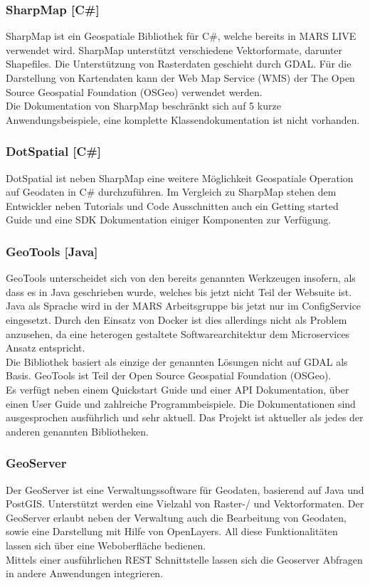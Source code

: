 \documentclass[10pt,conference,compsocconf]{IEEEtran}
\begin{document}
\subsubsection{SharpMap [C\#]}
SharpMap ist ein Geospatiale Bibliothek für C\#, welche bereits in MARS LIVE verwendet wird. SharpMap unterstützt verschiedene Vektorformate, darunter Shapefiles. Die Unterstützung von Rasterdaten geschieht durch GDAL. Für die Darstellung von Kartendaten kann der Web Map Service (WMS) der The Open Source Geospatial Foundation (OSGeo) verwendet werden.\\
Die Dokumentation von SharpMap beschränkt sich auf 5 kurze Anwendungsbeispiele, eine komplette Klassendokumentation ist nicht vorhanden.\\
	
\subsubsection{DotSpatial [C\#]}
DotSpatial ist neben SharpMap eine weitere Möglichkeit Geospatiale Operation auf Geodaten in C\# durchzuführen. Im Vergleich zu SharpMap stehen dem Entwickler neben Tutorials und Code Ausschnitten auch ein Getting started Guide und eine SDK Dokumentation einiger Komponenten zur Verfügung.\\
	
\subsubsection{GeoTools [Java]}
GeoTools unterscheidet sich von den bereits genannten Werkzeugen insofern, als dass es in Java geschrieben wurde, welches bis jetzt nicht Teil der Websuite ist. Java als Sprache wird in der MARS Arbeitsgruppe bis jetzt nur im ConfigService eingesetzt. Durch den Einsatz von Docker ist dies allerdings nicht als Problem anzusehen, da eine heterogen gestaltete Softwarearchitektur dem Microservices Ansatz entspricht.\\
Die Bibliothek basiert als einzige der genannten Lösungen nicht auf GDAL als Basis. GeoTools ist Teil der Open Source Geospatial Foundation (OSGeo).\\
Es verfügt neben einem Quickstart Guide und einer API Dokumentation, über einen User Guide und zahlreiche Programmbeispiele. Die Dokumentationen sind ausgesprochen ausführlich und sehr aktuell. Das Projekt ist aktueller als jedes der anderen genannten Bibliotheken.\\

\subsubsection{GeoServer}
\label{subsubsubsec:GeoServer}
Der GeoServer ist eine Verwaltungssoftware für Geodaten, basierend auf Java und PostGIS. Unterstützt werden eine Vielzahl von Raster-/ und Vektorformaten. Der GeoServer erlaubt neben der Verwaltung auch die Bearbeitung von Geodaten, sowie eine Darstellung mit Hilfe von OpenLayers. All diese Funktionalitäten lassen sich über eine Weboberfläche bedienen.\\
Mittels einer ausführlichen REST Schnittstelle lassen sich die Geoserver Abfragen in andere Anwendungen integrieren.\\
\end{document}
